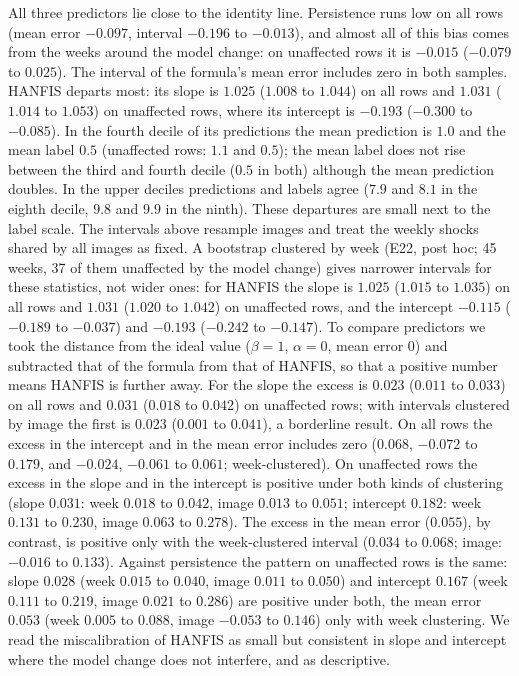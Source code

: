 \documentclass[pdflatex,sn-basic]{sn-jnl}
\theoremstyle{thmstyleone}%
\theoremstyle{thmstyletwo}%
\theoremstyle{thmstylethree}%
\begin{document}
All three predictors lie close to the identity line. Persistence runs low on all rows (mean error $-0.097$, interval $-0.196$ to $-0.013$), and almost all of this bias comes from the weeks around the model change: on unaffected rows it is $-0.015$ ($-0.079$ to $0.025$). The interval of the formula's mean error includes zero in both samples. HANFIS departs most: its slope is $1.025$ ($1.008$ to $1.044$) on all rows and $1.031$ ($1.014$ to $1.053$) on unaffected rows, where its intercept is $-0.193$ ($-0.300$ to $-0.085$). In the fourth decile of its predictions the mean prediction is $1.0$ and the mean label $0.5$ (unaffected rows: $1.1$ and $0.5$); the mean label does not rise between the third and fourth decile ($0.5$ in both) although the mean prediction doubles. In the upper deciles predictions and labels agree ($7.9$ and $8.1$ in the eighth decile, $9.8$ and $9.9$ in the ninth). These departures are small next to the label scale. The intervals above resample images and treat the weekly shocks shared by all images as fixed. A bootstrap clustered by week (E22, post hoc; 45 weeks, 37 of them unaffected by the model change) gives narrower intervals for these statistics, not wider ones: for HANFIS the slope is $1.025$ ($1.015$ to $1.035$) on all rows and $1.031$ ($1.020$ to $1.042$) on unaffected rows, and the intercept $-0.115$ ($-0.189$ to $-0.037$) and $-0.193$ ($-0.242$ to $-0.147$). To compare predictors we took the distance from the ideal value ($\beta=1$, $\alpha=0$, mean error $0$) and subtracted that of the formula from that of HANFIS, so that a positive number means HANFIS is further away. For the slope the excess is $0.023$ ($0.011$ to $0.033$) on all rows and $0.031$ ($0.018$ to $0.042$) on unaffected rows; with intervals clustered by image the first is $0.023$ ($0.001$ to $0.041$), a borderline result. On all rows the excess in the intercept and in the mean error includes zero ($0.068$, $-0.072$ to $0.179$, and $-0.024$, $-0.061$ to $0.061$; week-clustered). On unaffected rows the excess in the slope and in the intercept is positive under both kinds of clustering (slope $0.031$: week $0.018$ to $0.042$, image $0.013$ to $0.051$; intercept $0.182$: week $0.131$ to $0.230$, image $0.063$ to $0.278$). The excess in the mean error ($0.055$), by contrast, is positive only with the week-clustered interval ($0.034$ to $0.068$; image: $-0.016$ to $0.133$). Against persistence the pattern on unaffected rows is the same: slope $0.028$ (week $0.015$ to $0.040$, image $0.011$ to $0.050$) and intercept $0.167$ (week $0.111$ to $0.219$, image $0.021$ to $0.286$) are positive under both, the mean error $0.053$ (week $0.005$ to $0.088$, image $-0.053$ to $0.146$) only with week clustering. We read the miscalibration of HANFIS as small but consistent in slope and intercept where the model change does not interfere, and as descriptive.
\end{document}
